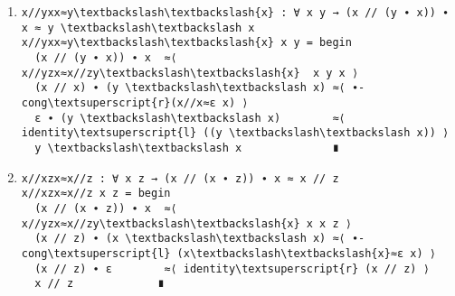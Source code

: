 \begin{enumerate}
\begin{Verbatim}[commandchars=\\\{\},samepage=true]
 (x // (y ∙ z)) ∙ x  ≈⟨ sym (xz\textbackslash\textbackslash{x}≈x//zx x ((y ∙ z))) ⟩
 x ∙ ((y ∙ z) \textbackslash\textbackslash x)  ≈⟨ middleBol x y z ⟩
 (x // z) ∙ (y \textbackslash\textbackslash x) ∎
\end{Verbatim}
\item
\begin{Verbatim}[commandchars=\\\{\},samepage=true]
x//yxx≈y\textbackslash\textbackslash{x} : ∀ x y → (x // (y ∙ x)) ∙ x ≈ y \textbackslash\textbackslash x
x//yxx≈y\textbackslash\textbackslash{x} x y = begin
  (x // (y ∙ x)) ∙ x  ≈⟨ x//yzx≈x//zy\textbackslash\textbackslash{x}  x y x ⟩
  (x // x) ∙ (y \textbackslash\textbackslash x) ≈⟨ ∙-cong\textsuperscript{r}(x//x≈ε x) ⟩
  ε ∙ (y \textbackslash\textbackslash x)        ≈⟨ identity\textsuperscript{l} ((y \textbackslash\textbackslash x)) ⟩
  y \textbackslash\textbackslash x              ∎
\end{Verbatim}
\item
\begin{Verbatim}[commandchars=\\\{\},samepage=true]
x//xzx≈x//z : ∀ x z → (x // (x ∙ z)) ∙ x ≈ x // z
x//xzx≈x//z x z = begin
  (x // (x ∙ z)) ∙ x  ≈⟨ x//yzx≈x//zy\textbackslash\textbackslash{x} x x z ⟩
  (x // z) ∙ (x \textbackslash\textbackslash x) ≈⟨ ∙-cong\textsuperscript{l} (x\textbackslash\textbackslash{x}≈ε x) ⟩
  (x // z) ∙ ε        ≈⟨ identity\textsuperscript{r} (x // z) ⟩
  x // z             ∎     
\end{Verbatim}
\end{enumerate}
